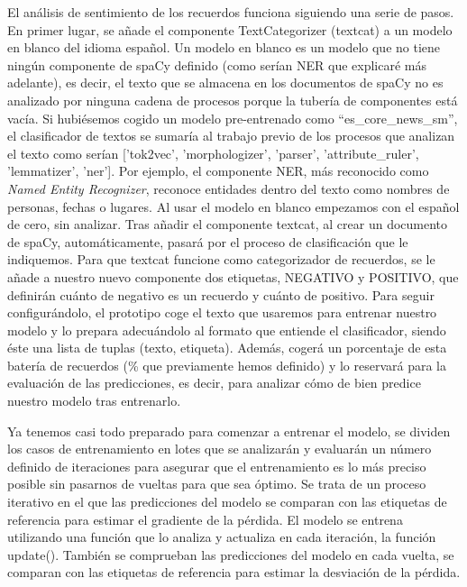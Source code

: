 El análisis de sentimiento de los recuerdos funciona siguiendo una serie de pasos. En primer lugar, se añade el componente TextCategorizer (textcat) a un modelo en blanco del idioma español. Un modelo en blanco es un modelo que no tiene ningún componente de spaCy definido (como serían NER que explicaré más adelante), es decir, el texto que se almacena en los documentos de spaCy no es analizado por ninguna cadena de procesos porque la tubería de componentes está vacía. Si hubiésemos cogido un modelo pre-entrenado como ``es\_core\_news\_sm'', el clasificador de textos se sumaría al trabajo previo de los procesos que analizan el texto como serían ['tok2vec', 'morphologizer', 'parser', 'attribute\_ruler', 'lemmatizer', 'ner']. Por ejemplo, el componente NER, más reconocido como \textit{Named Entity Recognizer}, reconoce entidades dentro del texto como nombres de personas, fechas o lugares. Al usar el modelo en blanco empezamos con el español de cero, sin analizar. Tras añadir el componente textcat, al crear un documento de spaCy, automáticamente, pasará por el proceso de clasificación que le indiquemos. Para que textcat funcione como categorizador de recuerdos, se le añade a nuestro nuevo componente dos etiquetas, NEGATIVO y POSITIVO, que definirán cuánto de negativo es un recuerdo y cuánto de positivo. Para seguir configurándolo, el prototipo coge el texto que usaremos para entrenar nuestro modelo y lo prepara adecuándolo al formato que entiende el clasificador, siendo éste una lista de tuplas (texto, etiqueta). Además, cogerá un porcentaje de esta batería de recuerdos (\% que previamente hemos definido) y lo reservará para la evaluación de las predicciones, es decir, para analizar cómo de bien predice nuestro modelo tras entrenarlo. 

Ya tenemos casi todo preparado para comenzar a entrenar el modelo, se dividen los casos de entrenamiento en lotes que se analizarán y evaluarán un número definido de iteraciones para asegurar que el entrenamiento es lo más preciso posible sin pasarnos de vueltas para que sea óptimo. Se trata de un proceso iterativo en el que las predicciones del modelo se comparan con las etiquetas de referencia para estimar el gradiente de la pérdida. El modelo se entrena utilizando una función que lo analiza y actualiza en cada iteración, la función update(). También se comprueban las predicciones del modelo en cada vuelta, se comparan con las etiquetas de referencia para estimar la desviación de la pérdida.

